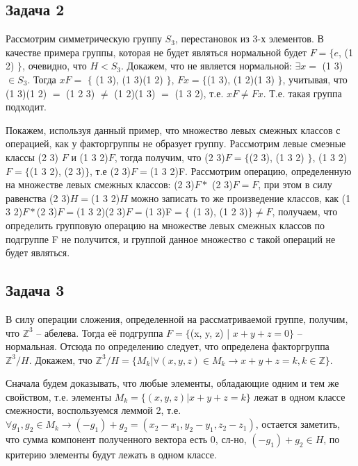 \documentclass[a4paper,14pt]{article} %
\begin{document}
\subsection{Задача 2}
Рассмотрим симметрическую группу $S_3$, перестановок из 3-х элементов. В качестве примера группы, которая не будет являться нормальной будет $F = \{e$, (1 2) $\}$, очевидно, что $H < S_3$. Докажем, что не является нормальной: $\exists x =$ (1 3) $\in S_3$.
Тогда $xF =$ $\{$ (1 3), (1 3)(1 2) $\}$, $Fx = \{$(1 3), (1 2)(1 3) $\}$, учитывая, что (1 3)(1 2) $=$ (1 2 3) $\not =$ (1 2)(1 3) $=$ (1 3 2), т.е. $xF \not = Fx$. Т.е. такая группа подходит.

Покажем, используя данный пример, что множество левых смежных классов с операцией, как у факторгруппы не образует группу. Рассмотрим левые смеэные классы (2 3) $F$ и (1 3 2)$F$, тогда получим, что (2 3)$F = \{$(2 3), (1 3 2) $\}$, (1 3 2)$F = \{$(1 3 2), (2 3)$\}$, т.е (2 3)$F =$(1 3 2)F.
Рассмотрим операцию, определенную на множестве левых смежных классов: (2 3)$F *$ (2 3)$F = F$, при этом в силу равенства (2 3)$H = $(1 3 2)$H$ можно записать то же произведение классов, как (1 3 2)$F * $(2 3)$F =$(1 3 2)(2 3)$F = $(1 3)F$ = \{$ (1 3), (1 2 3)$\} \not = F$, получаем, что определить 
групповую операцию на множестве левых смежных классов по подгруппе F не получится, и группой данное множество с такой операций не будет являться.

\subsection{Задача 3}
В силу операции сложения, определенной на рассматриваемой группе, получим, что $\mathds{Z}^3$ -- абелева. Тогда её подгруппа $F = \{$(x, y, z) | $x + y + z = 0 \}$ -- нормальная.
Отсюда по определению следует, что определена факторгруппа $\mathds{Z}^3 / H$. Докажем, тчо $\mathds{Z}^3 / H = \{M_k | \forall(x, y, z) \in M_k \rightarrow x + y + z = k, k \in \mathds{Z} \}$.

Сначала будем доказывать, что любые элементы, обладающие одним и тем же свойством, т.е. элементы $M_k = \{(x, y, z) | x + y + z = k \}$ лежат в одном классе смежности, воспользуемся леммой 2, т.е. $\forall g_1, g_2 \in M_k \rightarrow (-g_1) + g_2 = (x_2 - x_1, y_2 - y_1, z_2 - z_1)$,
остается заметить, что сумма компонент полученного вектора есть 0, сл-но, $(-g_1) + g_2 \in H$, по критерию элементы будут лежать в одном классе.
\end{document}

